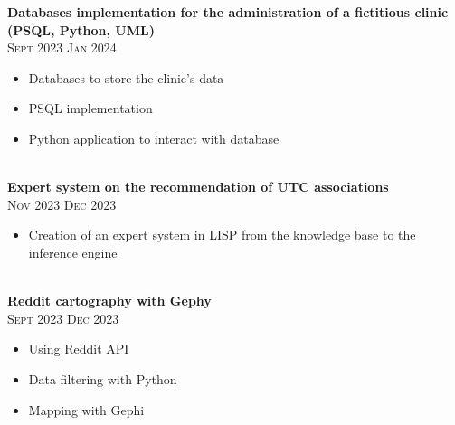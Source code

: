 \documentclass[oneside]{article}
\begin{document}
{\begin{minipage}[t][\dimexpr\textheight-2\fboxrule-2\fboxsep\relax][t]{\dimexpr0.6\textwidth-2\fboxrule-2\fboxsep\relax}
        {\large \textbf{Databases implementation for the administration of a fictitious clinic (PSQL, Python, UML)}} \\
        {\scshape{}\selectfont\footnotesize Sept 2023 \textendash{} Jan 2024} \\
        \vspace{-\baselineskip}
        \vspace{0.2cm}
        \begin{itemize}
            \setlength{\itemsep}{-5pt}
            \item Databases to store the clinic’s data
            \item PSQL implementation
            \item Python application to interact  with database
        \end{itemize}\\

        {\large \textbf{Expert system on the recommendation of UTC associations}} \\
        {\scshape{}\selectfont\footnotesize Nov 2023 \textendash{} Dec 2023} \\
        \vspace{-\baselineskip}
        \vspace{0.2cm}
        \begin{itemize}
            \setlength{\itemsep}{-5pt}
            \item Creation of an expert system in LISP from the knowledge base to the inference engine
        \end{itemize}\\
        
        {\large \textbf{Reddit cartography with Gephy}} \\
        {\scshape{}\selectfont\footnotesize Sept 2023 \textendash{} Dec 2023} \\
        \vspace{-\baselineskip}
        \vspace{0.2cm}
        \begin{itemize}
            \setlength{\itemsep}{-5pt}
            \item Using Reddit API
            \item Data filtering with Python
            \item Mapping with Gephi
        \end{itemize}\\


\end{minipage}}
\end{document}

